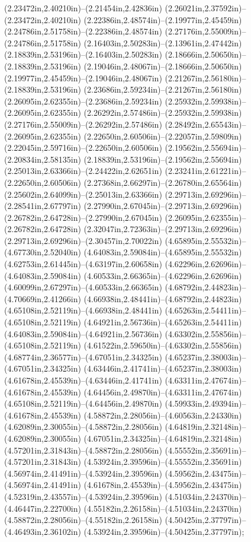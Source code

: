 (2.23472in,2.40210in)--(2.21454in,2.42836in) (2.26021in,2.37592in)--(2.23472in,2.40210in) (2.22386in,2.48574in)--(2.19977in,2.45459in) (2.24786in,2.51758in)--(2.22386in,2.48574in) (2.27176in,2.55009in)--(2.24786in,2.51758in) (2.16403in,2.50283in)--(2.13961in,2.47442in) (2.18839in,2.53196in)--(2.16403in,2.50283in) (2.18666in,2.50650in)--(2.18839in,2.53196in) (2.19046in,2.48067in)--(2.18666in,2.50650in) (2.19977in,2.45459in)--(2.19046in,2.48067in) (2.21267in,2.56180in)--(2.18839in,2.53196in) (2.23686in,2.59234in)--(2.21267in,2.56180in) (2.26095in,2.62355in)--(2.23686in,2.59234in) (2.25932in,2.59938in)--(2.26095in,2.62355in) (2.26292in,2.57486in)--(2.25932in,2.59938in) (2.27176in,2.55009in)--(2.26292in,2.57486in) (2.28492in,2.65543in)--(2.26095in,2.62355in) (2.22650in,2.60506in)--(2.22057in,2.59809in) (2.22045in,2.59716in)--(2.22650in,2.60506in) (2.19562in,2.55694in)--(2.20834in,2.58135in) (2.18839in,2.53196in)--(2.19562in,2.55694in) (2.25013in,2.63366in)--(2.24422in,2.62651in) (2.23241in,2.61221in)--(2.22650in,2.60506in) (2.27368in,2.66297in)--(2.26780in,2.65564in) (2.25602in,2.64099in)--(2.25013in,2.63366in) (2.29713in,2.69296in)--(2.28541in,2.67797in) (2.27990in,2.67045in)--(2.29713in,2.69296in) (2.26782in,2.64728in)--(2.27990in,2.67045in) (2.26095in,2.62355in)--(2.26782in,2.64728in) (2.32047in,2.72363in)--(2.29713in,2.69296in) (2.29713in,2.69296in)--(2.30457in,2.70022in) (4.65895in,2.55532in)--(4.67730in,2.52040in) (4.64083in,2.59084in)--(4.65895in,2.55532in) (4.62753in,2.61445in)--(4.63197in,2.60658in) (4.62296in,2.62696in)--(4.64083in,2.59084in) (4.60533in,2.66365in)--(4.62296in,2.62696in) (4.60099in,2.67297in)--(4.60533in,2.66365in) (4.68792in,2.44823in)--(4.70669in,2.41266in) (4.66938in,2.48441in)--(4.68792in,2.44823in) (4.65108in,2.52119in)--(4.66938in,2.48441in) (4.65263in,2.54411in)--(4.65108in,2.52119in) (4.64921in,2.56736in)--(4.65263in,2.54411in) (4.64083in,2.59084in)--(4.64921in,2.56736in) (4.63302in,2.55856in)--(4.65108in,2.52119in) (4.61522in,2.59650in)--(4.63302in,2.55856in) (4.68774in,2.36577in)--(4.67051in,2.34325in) (4.65237in,2.38003in)--(4.67051in,2.34325in) (4.63446in,2.41741in)--(4.65237in,2.38003in) (4.61678in,2.45539in)--(4.63446in,2.41741in) (4.63311in,2.47674in)--(4.61678in,2.45539in) (4.64456in,2.49870in)--(4.63311in,2.47674in) (4.65108in,2.52119in)--(4.64456in,2.49870in) (4.59933in,2.49394in)--(4.61678in,2.45539in) (4.58872in,2.28056in)--(4.60563in,2.24330in) (4.62089in,2.30055in)--(4.58872in,2.28056in) (4.64819in,2.32148in)--(4.62089in,2.30055in) (4.67051in,2.34325in)--(4.64819in,2.32148in) (4.57201in,2.31843in)--(4.58872in,2.28056in) (4.55552in,2.35691in)--(4.57201in,2.31843in) (4.53924in,2.39596in)--(4.55552in,2.35691in) (4.56974in,2.41491in)--(4.53924in,2.39596in) (4.59562in,2.43475in)--(4.56974in,2.41491in) (4.61678in,2.45539in)--(4.59562in,2.43475in) (4.52319in,2.43557in)--(4.53924in,2.39596in) (4.51034in,2.24370in)--(4.46447in,2.22700in) (4.55182in,2.26158in)--(4.51034in,2.24370in) (4.58872in,2.28056in)--(4.55182in,2.26158in) (4.50425in,2.37797in)--(4.46493in,2.36102in) (4.53924in,2.39596in)--(4.50425in,2.37797in);
